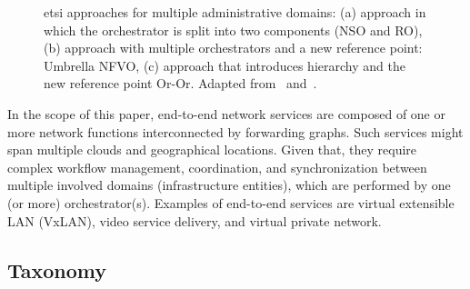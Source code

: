 \begin{figure}[t!]
{   \label{fig:use2}
 }
 \caption{\gls{etsi} approaches for multiple administrative domains: (a) approach in which the orchestrator is split into two components (NSO and RO), (b) approach with multiple orchestrators and a new reference point: Umbrella NFVO, (c) approach that introduces hierarchy and the new reference point Or-Or. Adapted from~\cite{ETSIIndustrySpecificationGroupISGNFV2014NetworkOptions} and~\cite{ETSIGRDomains}.}
 \label{fig:k-clique}  
\end{figure}

In the scope of this paper, end-to-end network services are composed of one or more network functions interconnected by forwarding graphs. Such services might span multiple clouds and geographical locations. Given that, they require complex workflow management, coordination, and synchronization between multiple involved domains (infrastructure entities), which are performed by one (or more) orchestrator(s). Examples of end-to-end services are virtual extensible LAN (VxLAN), video service delivery, and virtual private network.

\subsection{Taxonomy}

